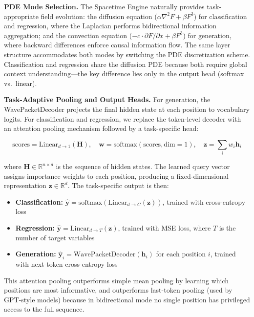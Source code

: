 \documentclass{article}
\begin{document}
\textbf{PDE Mode Selection.} The Spacetime Engine naturally provides task-appropriate field evolution: the diffusion equation ($\alpha \nabla^2 F + \beta F^3$) for classification and regression, where the Laplacian performs bidirectional information aggregation; and the convection equation ($-c \cdot \partial F/\partial x + \beta F^3$) for generation, where backward differences enforce causal information flow. The same layer structure accommodates both modes by switching the PDE discretization scheme. Classification and regression share the diffusion PDE because both require global context understanding---the key difference lies only in the output head (softmax vs.\ linear).

\textbf{Task-Adaptive Pooling and Output Heads.} For generation, the WavePacketDecoder projects the final hidden state at each position to vocabulary logits. For classification and regression, we replace the token-level decoder with an attention pooling mechanism followed by a task-specific head:

\begin{equation}
\text{scores} = \text{Linear}_{d \to 1}(\mathbf{H}), \quad \mathbf{w} = \text{softmax}(\text{scores}, \text{dim}=1), \quad \mathbf{z} = \sum_i w_i \mathbf{h}_i
\end{equation}

where $\mathbf{H} \in \mathbb{R}^{n \times d}$ is the sequence of hidden states. The learned query vector assigns importance weights to each position, producing a fixed-dimensional representation $\mathbf{z} \in \mathbb{R}^d$. The task-specific output is then:
\begin{itemize}
\item \textbf{Classification:} $\hat{\mathbf{y}} = \text{softmax}(\text{Linear}_{d \to C}(\mathbf{z}))$, trained with cross-entropy loss
\item \textbf{Regression:} $\hat{\mathbf{y}} = \text{Linear}_{d \to T}(\mathbf{z})$, trained with MSE loss, where $T$ is the number of target variables
\item \textbf{Generation:} $\hat{\mathbf{y}}_i = \text{WavePacketDecoder}(\mathbf{h}_i)$ for each position $i$, trained with next-token cross-entropy loss
\end{itemize}

This attention pooling outperforms simple mean pooling by learning which positions are most informative, and outperforms last-token pooling (used by GPT-style models) because in bidirectional mode no single position has privileged access to the full sequence.
\end{document}
